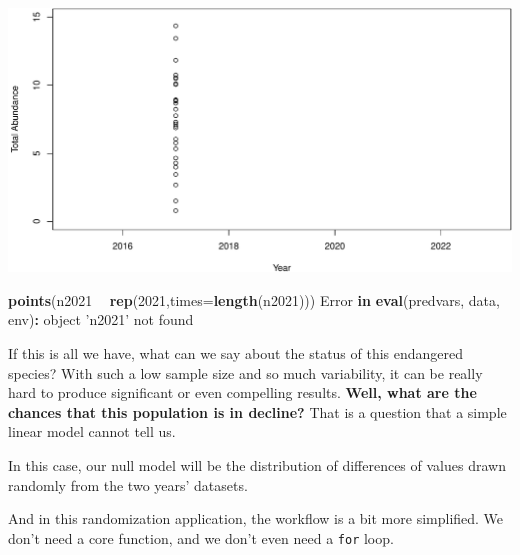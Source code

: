 \documentclass[]{book}
\newenvironment{Shaded}{\begin{snugshade}}{\end{snugshade}}
\newcommand{\ControlFlowTok}[1]{\textcolor[rgb]{0.13,0.29,0.53}{\textbf{#1}}}
\newcommand{\DataTypeTok}[1]{\textcolor[rgb]{0.13,0.29,0.53}{#1}}
\newcommand{\DecValTok}[1]{\textcolor[rgb]{0.00,0.00,0.81}{#1}}
\newcommand{\KeywordTok}[1]{\textcolor[rgb]{0.13,0.29,0.53}{\textbf{#1}}}
\newcommand{\NormalTok}[1]{#1}
\newcommand{\OperatorTok}[1]{\textcolor[rgb]{0.81,0.36,0.00}{\textbf{#1}}}
\newcommand{\StringTok}[1]{\textcolor[rgb]{0.31,0.60,0.02}{#1}}
\begin{document}
\includegraphics{figures/unnamed-chunk-704-1.pdf}

\begin{Shaded}
\begin{Highlighting}[]
\KeywordTok{points}\NormalTok{(n2021 }\OperatorTok{~}\StringTok{ }\KeywordTok{rep}\NormalTok{(}\DecValTok{2021}\NormalTok{,}\DataTypeTok{times=}\KeywordTok{length}\NormalTok{(n2021)))}
\NormalTok{Error }\ControlFlowTok{in} \KeywordTok{eval}\NormalTok{(predvars, data, env)}\OperatorTok{:}\StringTok{ }\NormalTok{object }\StringTok{'n2021'}\NormalTok{ not found}
\end{Highlighting}
\end{Shaded}

If this is all we have, what can we say about the status of this endangered species? With such a low sample size and so much variability, it can be really hard to produce significant or even compelling results. \textbf{Well, what are the chances that this population is in decline?} That is a question that a simple linear model cannot tell us.

In this case, our null model will be the distribution of differences of values drawn randomly from the two years' datasets.

And in this randomization application, the workflow is a bit more simplified. We don't need a core function, and we don't even need a \texttt{for} loop.
\end{document}
